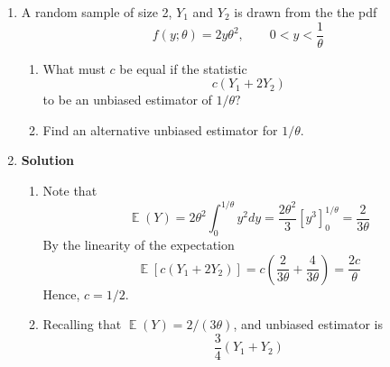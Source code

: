 \documentclass[11pt,a4paper]{article}
\DeclareMathOperator{\E}{\mathbb{E}}
\begin{document}
\begin{enumerate}[labelindent=0pt,labelwidth=0.75em,leftmargin=!]
\begin{enumerate}
\end{enumerate}
\item 
A random sample of size 2, $Y_1$ and $Y_2$ is drawn from the the pdf 
$$
f(y;\theta)=2y\theta^2,\qquad 0<y<\frac{1}{\theta}
$$
\begin{enumerate}
\item What must $c$ be equal if the statistic 
$$
c(Y_1+2Y_2)
$$
to be an unbiased estimator of $1/\theta?$
\item Find an alternative unbiased estimator for $1/\theta$.
\end{enumerate}
\item[]\textbf{Solution}
\begin{enumerate}
\item 
Note that
$$
\E(Y)=2\theta^2\int_{0}^{1/\theta}y^2dy=\frac{2\theta^2}{3}\left[y^3\right]_0^{1/\theta}=\frac{2}{3\theta}
$$
By the linearity of the expectation
$$
\E\left[c(Y_1+2Y_2)\right]=c\left(\frac{2}{3\theta}+\frac{4}{3\theta}\right)=\frac{2c}{\theta}
$$
Hence, $c=1/2$.
\item Recalling that $\E(Y)=2/(3\theta)$, and unbiased estimator is 
$$
\frac{3}{4}\left(Y_1+Y_2\right)
$$
\end{enumerate}
\end{enumerate}
\end{document}
